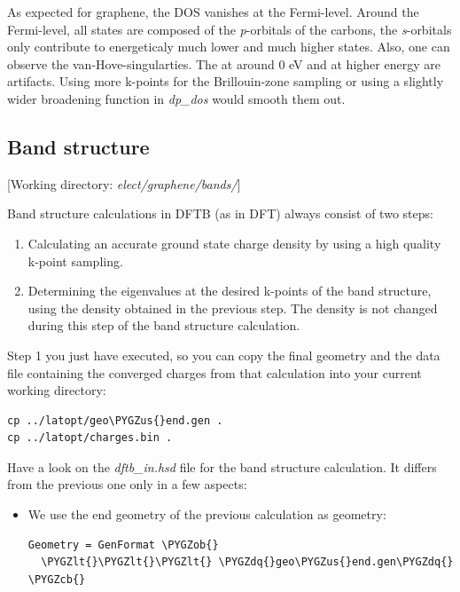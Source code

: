 \documentclass[a4paper,11pt,english]{sphinxmanual}
\def\PYGZus{\char`\_}
\def\PYGZob{\char`\{}
\def\PYGZcb{\char`\}}
\def\PYGZlt{\char`\<}
\def\PYGZdq{\char`\"}
\begin{document}
{{As expected for graphene, the DOS vanishes at the Fermi-level. Around
the Fermi-level, all states are composed of the \emph{p}-orbitals of the
carbons, the \emph{s}-orbitals only contribute to energeticaly much lower
and much higher states. Also, one can observe the
van-Hove-singularties. The  at around 0 eV and at higher
energy are artifacts. Using more k-points for the Brillouin-zone
sampling or using a slightly wider broadening function in \emph{dp\_dos}
would smooth them out.


\subsection{Band structure}
\label{electstruct:band-structure}
{[}Working directory: \emph{elect/graphene/bands/}{]}

Band structure calculations in DFTB (as in DFT) always consist of two
steps:
\begin{enumerate}
\item {} 
Calculating an accurate ground state charge density by using a high
quality k-point sampling.

\item {} 
Determining the eigenvalues at the desired k-points of the band
structure, using the density obtained in the previous step. The
density is not changed during this step of the band structure
calculation.

\end{enumerate}

Step 1 you just have executed, so you can copy the final geometry and the data
file containing the converged charges from that calculation into your current
working directory:

\begin{Verbatim}[commandchars=\\\{\}]
cp ../latopt/geo\PYGZus{}end.gen .
cp ../latopt/charges.bin .
\end{Verbatim}

Have a look on the \emph{dftb\_in.hsd} file for the band structure
calculation. It differs from the previous one only in a few aspects:
\begin{itemize}
\item {} 
We use the end geometry of the previous calculation as geometry:

\begin{Verbatim}[commandchars=\\\{\}]
Geometry = GenFormat \PYGZob{}
  \PYGZlt{}\PYGZlt{}\PYGZlt{} \PYGZdq{}geo\PYGZus{}end.gen\PYGZdq{}
\PYGZcb{}
\end{Verbatim}


\end{itemize}}}
\end{document}
